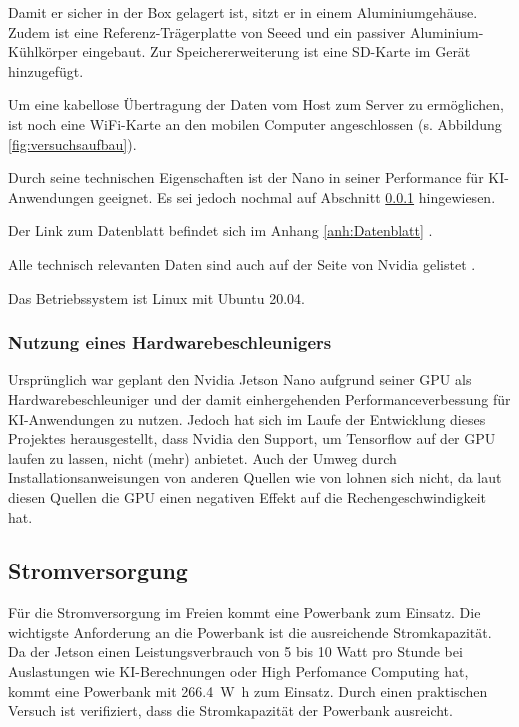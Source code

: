 Damit er sicher in der Box gelagert ist, sitzt er in einem Aluminiumgehäuse. Zudem ist eine Referenz-Trägerplatte von Seeed und ein passiver Aluminium-Kühlkörper eingebaut. Zur Speichererweiterung ist eine SD-Karte im Gerät hinzugefügt.

Um eine kabellose Übertragung der Daten vom Host zum Server zu ermöglichen, ist noch eine WiFi-Karte an den mobilen Computer angeschlossen (s. Abbildung \ref{fig:versuchsaufbau}).

Durch seine technischen Eigenschaften ist der Nano in seiner Performance für KI-Anwendungen geeignet. Es sei jedoch nochmal auf Abschnitt \ref{subsubsec:} hingewiesen.

Der Link zum Datenblatt befindet sich im Anhang \ref{anh:Datenblatt} \cite{jetson_datasheet}.

Alle technisch relevanten Daten sind auch auf der Seite von Nvidia gelistet \cite{jetson_web}.

Das Betriebssystem ist Linux mit Ubuntu 20.04.


\subsubsection{Nutzung eines Hardwarebeschleunigers}
\label{subsubsec:}
Ursprünglich war geplant den Nvidia Jetson Nano aufgrund seiner GPU als Hardwarebeschleuniger und der damit einhergehenden Performanceverbessung für KI-Anwen\-dung\-en zu nutzen. Jedoch hat sich im Laufe der Entwicklung dieses Projektes herausgestellt, dass Nvidia den Support, um Tensorflow %
auf der GPU laufen zu lassen, nicht (mehr) anbietet. Auch der Umweg durch Installationsanweisungen von anderen Quellen wie von \cite{qengineering}
lohnen sich nicht, da laut diesen Quellen die GPU einen negativen Effekt auf die Rechengeschwindigkeit hat.

\subsection{Stromversorgung \label{subsec:Stromversorgung}}
Für die Stromversorgung im Freien kommt eine Powerbank zum Einsatz. Die wichtigste Anforderung an die Powerbank ist die ausreichende Stromkapazität.
Da der Jetson einen Leistungsverbrauch von 5 bis 10 Watt pro Stunde bei Auslastungen wie KI-Berechnungen oder High Perfomance Computing hat, kommt eine Powerbank mit \SI{266,4}{\watt\hour} zum Einsatz. 
Durch einen praktischen Versuch ist verifiziert, dass die Stromkapazität der Powerbank ausreicht.

